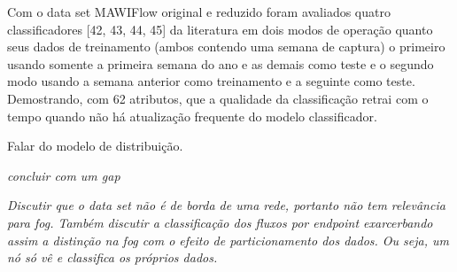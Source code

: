 Com o data set MAWIFlow original e reduzido foram avaliados quatro classificadores [42, 43, 44, 45]
da literatura em dois modos de operação quanto seus dados de treinamento
(ambos contendo uma semana de captura) o primeiro usando somente a primeira semana do ano e as demais
como teste e o segundo modo usando a semana anterior como treinamento e a seguinte como teste.
Demostrando, com 62 atributos, que a qualidade da classificação retrai com o tempo quando não há
atualização frequente do modelo classificador.

Falar do modelo de distribuição.

\textit{concluir com um gap}

\textit{Discutir que o data set não é de borda de uma rede, portanto não tem
relevância para fog. Também discutir a classificação dos fluxos por endpoint
exarcerbando assim a distinção na fog com o efeito de particionamento dos dados.
Ou seja, um nó só vê e classifica os próprios dados.}
